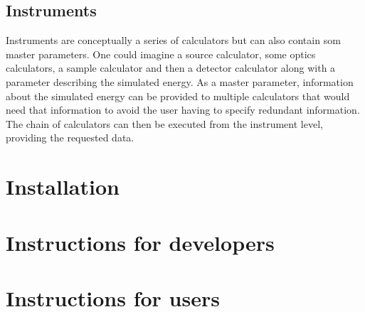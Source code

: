 \documentclass[10pt]{scrartcl}
\begin{document}
\subsection{Instruments}
\label{sec:instruments}
Instruments are conceptually a series of calculators but can also contain som master parameters. One could imagine a source calculator, some optics calculators, a sample calculator and then a detector calculator along with a parameter describing the simulated energy. As a master parameter, information about the simulated energy can be provided to multiple calculators that would need that information to avoid the user having to specify redundant information. The chain of calculators can then be executed from the instrument level, providing the requested data.

\section{Installation}
\label{sec:installation}

\section{Instructions for developers}
\label{sec:dev}

\section{Instructions for users}
\label{sec:users}
\end{document}
